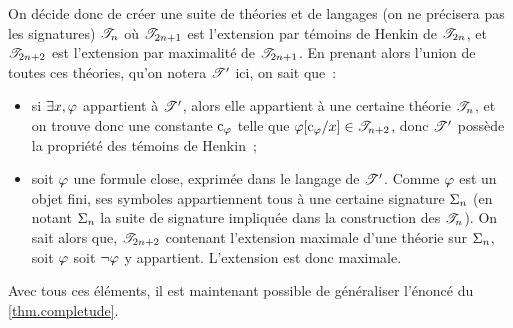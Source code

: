 On décide donc de créer une suite de théories et de langages (on ne précisera
pas les signatures) $\mathscr T_n$ où $\mathscr T_{2n+1}$ est l'extension par témoins
de Henkin de $\mathscr T_{2n}$, et $\mathscr T_{2n+2}$ est l'extension par
maximalité de $\mathscr T_{2n+1}$. En prenant alors l'union de toutes ces
théories, qu'on notera $\mathscr T'$ ici, on sait que~:
\begin{itemize}
\item si $\exists x, \varphi$ appartient à $\mathscr T'$, alors elle appartient
  à une certaine théorie $\mathscr T_n$, et on trouve donc une constante
  $\mathrm{c}_{\varphi}$ telle que $\varphi[\mathrm{c}_{\varphi}/x] \in \mathscr T_{n+2}$, donc
  $\mathscr T'$ possède la propriété des témoins de Henkin~;
\item soit $\varphi$ une formule close, exprimée dans le langage de $\mathscr T'$.
  Comme $\varphi$ est un objet fini, ses symboles appartiennent tous à une
  certaine signature $\Sigma_{n}$ (en notant $\Sigma_{n}$ la suite de
  signature impliquée dans la construction des $\mathscr T_n$). On sait alors que,
  $\mathscr T_{2n+2}$ contenant l'extension maximale d'une théorie sur $\Sigma_{n}$,
  soit $\varphi$ soit $\lnot\varphi$ y appartient. L'extension est donc maximale.
\end{itemize}

Avec tous ces éléments, il est maintenant possible de généraliser l'énoncé du
\cref{thm.completude}.

